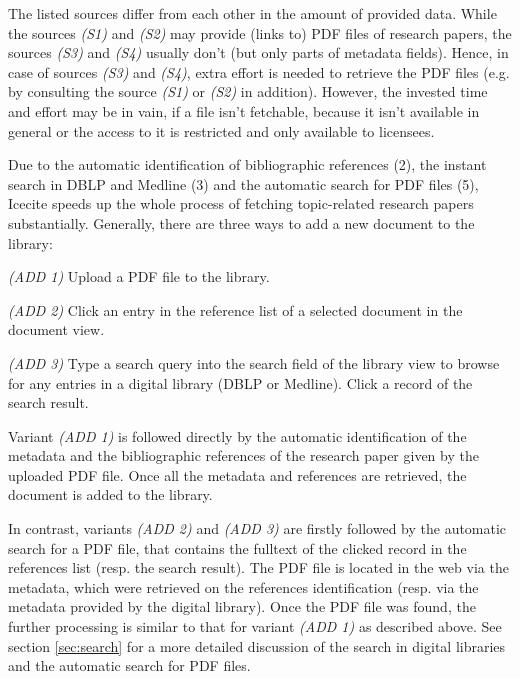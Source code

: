 The listed sources differ from each other in the amount of provided data. While the sources \textit{(S1)} and \textit{(S2)} may provide (links to) PDF files of research papers, the sources \textit{(S3)} and \textit{(S4)} usually don't (but only parts of metadata fields). Hence, in case of sources \textit{(S3)} and \textit{(S4)}, extra effort is needed to retrieve the PDF files (e.g. by consulting the source \textit{(S1)} or \textit{(S2)} in addition). However, the invested time and effort may be in vain, if a file isn't fetchable, because it isn't available in general or the access to it is restricted and only available to licensees. 

Due to the automatic identification of bibliographic references (2), the instant search in DBLP and Medline (3) and the automatic search for PDF files (5), Icecite speeds up the whole process of fetching topic-related research papers substantially. 
Generally, there are three ways to add a new document to the library: 

\par\medskip\noindent
\textit{(ADD 1)} Upload a PDF file to the library.
\par\medskip\noindent
\textit{(ADD 2)} Click an entry in the reference list of a selected document in the document view.
\par\medskip\noindent
\textit{(ADD 3)} Type a search query into the search field of the library view to browse for any entries in a digital library (DBLP or Medline). Click a record of the search result.
\medskip

Variant \textit{(ADD 1)} is followed directly by the automatic identification of the metadata and the bibliographic references of the research paper given by the uploaded PDF file. Once all the metadata and references are retrieved, the document is added to the library.

In contrast, variants \textit{(ADD 2)} and \textit{(ADD 3)} are firstly followed by the automatic search for a PDF file, that contains the fulltext of the clicked record in the references list (resp. the search result). The PDF file is located in the web via the metadata, which were retrieved on the references identification (resp. via the metadata provided by the digital library). Once the PDF file was found, the further processing is similar to that for variant \textit{(ADD 1)} as described above. See section \ref{sec:search} for a more detailed discussion of the search in digital libraries and the automatic search for PDF files.

